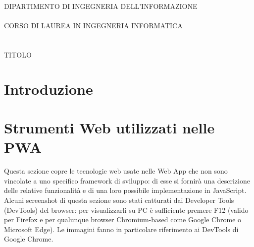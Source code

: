 \documentclass[a4paper, 12pt, twoside, openright]{book}
\newenvironment{abstract}{\cleardoublepage \null \vfill \begin{center}\bfseries\abstractname \end{center}}{\vfill\null}
\begin{document}
\frontmatter
\begin{titlepage}
	\begin{flushleft}
		
		\begin{minipage}[b][1,8 cm][c]{0.3\columnwidth}
			\textsf{{\color{Sepia}{DIPARTIMENTO\\DI INGEGNERIA\\DELL'INFORMAZIONE}}}
		\end{minipage}
	\end{flushleft}
	
	\vfill
	\begin{center}
		\begin{large}
			DIPARTIMENTO DI INGEGNERIA DELL'INFORMAZIONE
			\\~\\
			CORSO DI LAUREA IN INGEGNERIA INFORMATICA
			\\~\\~\\
			TITOLO
		\end{large}
	\end{center}
\end{titlepage}
\cleardoublepage %

\begingroup %
  \makeatletter
  \let\ps@plain\ps@empty
  \makeatother
  \tableofcontents
  \clearpage
\endgroup


\begin{abstract} %
\markboth{}{} %
\thispagestyle{empty}
\end{abstract}


\mainmatter\doublespace 

\chapter*{Introduzione} %
\thispagestyle{empty}

\chapter{Strumenti Web utilizzati nelle PWA}
Questa sezione copre le tecnologie web usate nelle Web App che non sono vincolate a uno specifico framework di sviluppo: di esse si fornirà una descrizione delle relative funzionalità e di una loro possibile implementazione in JavaScript.\\
Alcuni screenshot di questa sezione sono stati catturati dai Developer Tools (DevTools) del browser: per visualizzarli su PC è sufficiente premere F12 (valido per Firefox e per qualunque browser Chromium-based come Google Chrome o Microsoft Edge). Le immagini fanno in particolare riferimento ai DevTools di Google Chrome.
\end{document}

